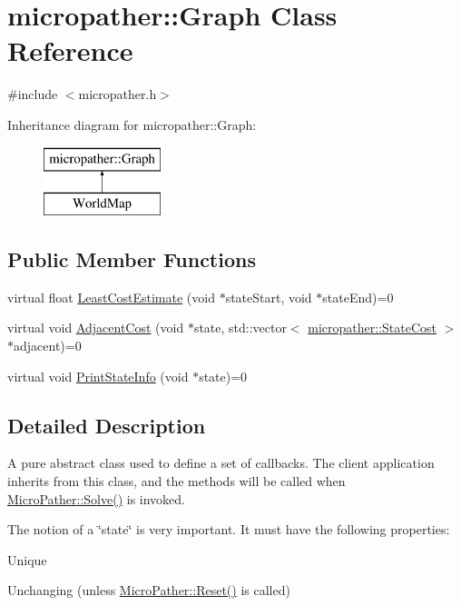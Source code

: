 \hypertarget{classmicropather_1_1_graph}{\section{micropather\-:\-:Graph Class Reference}
\label{classmicropather_1_1_graph}
}


{\ttfamily \#include $<$micropather.\-h$>$}

Inheritance diagram for micropather\-:\-:Graph\-:\begin{figure}[H]
\begin{center}
\leavevmode
\includegraphics[height=2.000000cm]{classmicropather_1_1_graph}
\end{center}
\end{figure}
\subsection*{Public Member Functions}
\begin{DoxyCompactItemize}
\item 
virtual float \hyperlink{classmicropather_1_1_graph_a7a284a95607553e15439ecc7a1440abc}{Least\-Cost\-Estimate} (void $\ast$state\-Start, void $\ast$state\-End)=0
\item 
virtual void \hyperlink{classmicropather_1_1_graph_acc601fe0c8f0774e37208c9e15eba00a}{Adjacent\-Cost} (void $\ast$state, std\-::vector$<$ \hyperlink{structmicropather_1_1_state_cost}{micropather\-::\-State\-Cost} $>$ $\ast$adjacent)=0
\item 
virtual void \hyperlink{classmicropather_1_1_graph_a9ca57ce2dceccece9654545b7dfad6ff}{Print\-State\-Info} (void $\ast$state)=0
\end{DoxyCompactItemize}


\subsection{Detailed Description}
A pure abstract class used to define a set of callbacks. The client application inherits from this class, and the methods will be called when \hyperlink{classmicropather_1_1_micro_pather_af81b5dad8f89610026b8f0762d981730}{Micro\-Pather\-::\-Solve()} is invoked.

The notion of a \char`\"{}state\char`\"{} is very important. It must have the following properties\-:
\begin{DoxyItemize}
\item Unique
\item Unchanging (unless \hyperlink{classmicropather_1_1_micro_pather_aa830a9fa99403c14c6791f513a8e2342}{Micro\-Pather\-::\-Reset()} is called)
\end{DoxyItemize}

